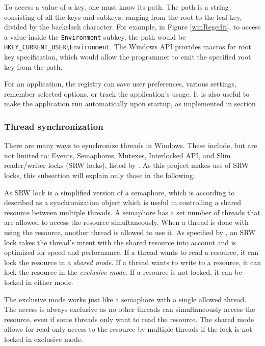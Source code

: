 To access a value of a key, one must know its path. The path is a string consisting of all the keys and subkeys, ranging from the root to the leaf key, divided by the backslash character.\cite{WinRegStruct}
For example, in Figure \ref{winRegedit}, to access a value inside the \lstinline{Environment} subkey, the path would be \lstinline{HKEY_CURRENT_USER}\textbackslash{}\lstinline{Environment}. The Windows API provides macros for root key specification, which would allow the programmer to emit the specified root key from the path.

For an application, the registry can save user preferences, various settings, remember selected options, or track the application's usage. It is also useful to make the application run automatically upon startup, as implemented in section .

\subsubsection{Thread synchronization}
There are many ways to synchronize threads in Windows. These include, but are not limited to: Events, Semaphores, Mutexes, Interlocked API, and Slim reader/writer locks (SRW locks), listed by \cite{WinSyncFuncs}. As this project makes use of SRW locks, this subsection will explain only those in the following.

As SRW lock is a simplified version of a semaphore, which is according to \cite{WinSemaphores} described as a synchronization object which is useful in controlling a shared resource between multiple threads. A semaphore has a set number of threads that are allowed to access the resource simultaneously. When a thread is done with using the resource, another thread is allowed to use it. As specified by \cite{WinSRW}, an SRW lock takes the thread's intent with the shared resource into account and is optimized for speed and performance. If a thread wants to read a resource, it can lock the resource in a \textit{shared mode}. If a thread wants to write to a resource, it can lock the resource in the \textit{exclusive mode}. If a resource is not locked, it can be locked in either mode. 

The exclusive mode works just like a semaphore with a single allowed thread. The access is always exclusive as no other threads can simultaneously access the resource, even if some threads only want to read the resource.
The shared mode allows for read-only access to the resource by multiple threads if the lock is not locked in exclusive mode.

